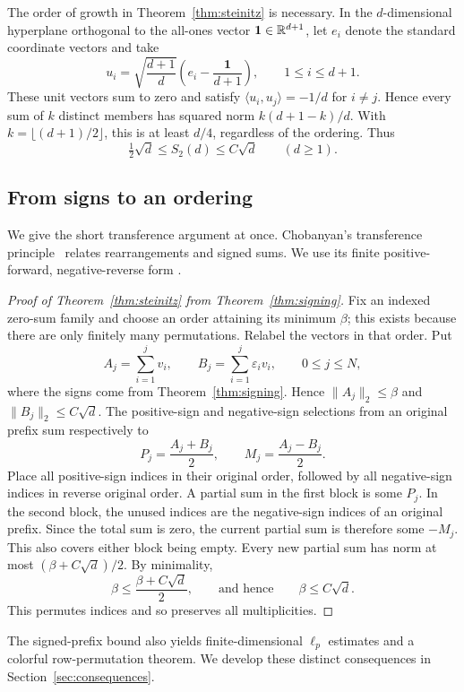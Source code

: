 The order of growth in Theorem~\ref{thm:steinitz} is necessary. In the
$d$-dimensional hyperplane orthogonal to the all-ones vector
$\mathbf1\in\mathbb R^{d+1}$, let $e_i$ denote the standard coordinate vectors and take
\[
 u_i=\sqrt{\frac{d+1}{d}}\left(e_i-\frac{\mathbf1}{d+1}\right),
 \qquad 1\le i\le d+1.
\]
These unit vectors sum to zero and satisfy $\langle u_i,u_j\rangle=-1/d$
for $i\ne j$. Hence every sum of $k$ distinct members has squared norm
$k(d+1-k)/d$. With $k=\lfloor(d+1)/2\rfloor$, this is at least $d/4$,
regardless of the ordering. Thus
\[
 \tfrac12\sqrt d\le S_2(d)\le C\sqrt d\qquad(d\ge1).
\]

\subsection{From signs to an ordering}

We give the short transference argument at once. Chobanyan's
transference principle~\cite{Chobanyan1994} relates rearrangements and
signed sums. We use its finite positive-forward, negative-reverse form
\cite[Theorem~2.1 and Remark~1]{ChobanyanEtAl2023}.

\begin{proof}[Proof of Theorem~\ref{thm:steinitz} from Theorem~\ref{thm:signing}]
Fix an indexed zero-sum family and choose an order attaining its minimum
$\beta$; this exists because there are only finitely many permutations.
Relabel the vectors in that order. Put
\[
 A_j=\sum_{i=1}^jv_i,
 \qquad B_j=\sum_{i=1}^j\varepsilon_i v_i,
 \qquad 0\le j\le N,
\]
where the signs come from Theorem~\ref{thm:signing}. Hence
$\lVert A_j\rVert_2\le\beta$ and $\lVert B_j\rVert_2\le C\sqrt d$.
The positive-sign and negative-sign selections from an original prefix
sum respectively to
\[
 P_j=\frac{A_j+B_j}{2},\qquad M_j=\frac{A_j-B_j}{2}.
\]
Place all positive-sign indices in their original order, followed by all
negative-sign indices in reverse original order. A partial sum in the
first block is some $P_j$. In the second block, the unused indices are
the negative-sign indices of an original prefix. Since the total sum
is zero, the current partial sum is therefore some $-M_j$. This also
covers either block being empty. Every new partial sum has norm at most
$(\beta+C\sqrt d)/2$. By minimality,
\[
 \beta\le\frac{\beta+C\sqrt d}{2},
 \qquad\text{and hence}\qquad \beta\le C\sqrt d.
\]
This permutes indices and so preserves all multiplicities.
\end{proof}

The signed-prefix bound also yields finite-dimensional $\ell_p$ estimates
and a colorful row-permutation theorem. We develop these distinct
consequences in Section~\ref{sec:consequences}.

